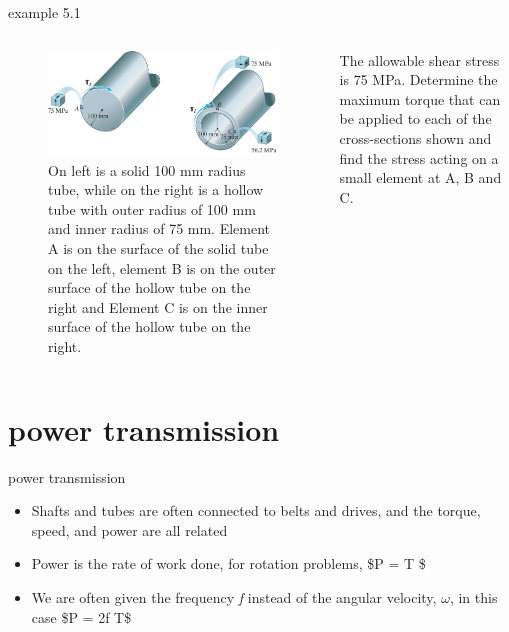 \documentclass[
  letterpaper,
  ignorenonframetext,
  aspectratio=43,
  handout,
  12pt]{beamer}
\providecommand{\tightlist}{%
  \setlength{\itemsep}{0pt}\setlength{\parskip}{0pt}}
\providecommand{\tightlist}{%
\setlength{\itemsep}{0pt}\setlength{\parskip}{0pt}}
\let\Oldincludegraphics\includegraphics
\renewcommand{\includegraphics}[2][]{\Oldincludegraphics[width=\textwidth,height=0.7\textheight,keepaspectratio]{#2}}
\begin{document}
\begin{frame}{example 5.1}
\protect\hypertarget{example-5.1}{}
\begin{columns}[T]
\begin{column}{0.5\textwidth}
\begin{figure}
\centering
\includegraphics{../images/example-5-1.png}
\caption{On left is a solid 100 mm radius tube, while on the right is a
hollow tube with outer radius of 100 mm and inner radius of 75 mm.
Element A is on the surface of the solid tube on the left, element B is
on the outer surface of the hollow tube on the right and Element C is on
the inner surface of the hollow tube on the right.}
\end{figure}
\end{column}

\begin{column}{0.5\textwidth}
The allowable shear stress is 75 MPa. Determine the maximum torque that
can be applied to each of the cross-sections shown and find the stress
acting on a small element at A, B and C.
\end{column}
\end{columns}
\end{frame}

\hypertarget{power-transmission}{%
\section{power transmission}\label{power-transmission}}

\begin{frame}{power transmission}
\protect\hypertarget{power-transmission-1}{}
\begin{itemize}
\tightlist
\item
  Shafts and tubes are often connected to belts and drives, and the
  torque, speed, and power are all related
\item
  Power is the rate of work done, for rotation problems, \$P = T
  \omega\$
\item
  We are often given the frequency \emph{f} instead of the angular
  velocity, \(\omega\), in this case \$P = 2\pi f T\$
\end{itemize}
\end{frame}
\end{document}
